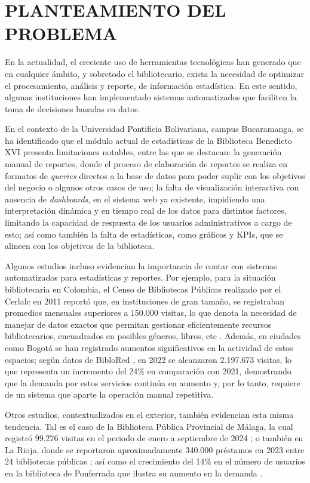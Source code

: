 \documentclass[spanish]{ieee_upb}
\begin{document}
\newpage
\section{PLANTEAMIENTO DEL PROBLEMA}

En la actualidad, el creciente uso de herramientas tecnológicas han generado que en cualquier ámbito, y sobretodo el bibliotecario, exista la necesidad de optimizar el procesamiento, análisis y reporte, de información estadística. En este sentido, algunas instituciones han implementado sistemas automatizados que faciliten la toma de decisiones basadas en datos. 


En el contexto de la Universidad Pontificia Bolivariana, campus Bucaramanga, se ha identificado que el módulo actual de estadísticas de la Biblioteca Benedicto XVI presenta limitaciones notables, entre las que se destacan: la generación manual de reportes, donde el proceso de elaboración de reportes se realiza en formatos de \textit{queries} directos a la base de datos para poder suplir con los objetivos del negocio o algunos otros casos de uso; la falta de visualización interactiva con ausencia de \textit{dashboards}, en el sistema web ya existente, impidiendo una interpretación dinámica y en tiempo real de los datos para distintos factores, limitando la capacidad de respuesta de los usuarios administrativos a cargo de esto; así como también la falta de estadísticas, como gráficos y KPIs, que se alineen con los objetivos de la biblioteca.


Algunos estudios incluso evidencian la importancia de contar con sistemas automatizados para estadísticas y reportes. Por ejemplo, para la situación bibliotecaria en Colombia, el Censo de Bibliotecas Públicas realizado por el Cerlalc en 2011 reportó que, en instituciones de gran tamaño, se registraban promedios mensuales superiores a 150.000 visitas, lo que denota la necesidad de manejar de datos exactos que permitan gestionar eficientemente recursos bibliotecarios, encuadrados en posibles géneros, libros, etc \cite{CERLALC2011}. Además, en ciudades como Bogotá se han registrado aumentos significativos en la actividad de estos espacios; según datos de BibloRed \cite{BIBLORED2022}, en 2022 se alcanzaron 2.197.673 visitas, lo que representa un incremento del 24\% en comparación con 2021, demostrando que la demanda por estos servicios continúa en aumento y, por lo tanto, requiere de un sistema que aparte la operación manual repetitiva.


Otros estudios, contextualizados en el exterior, también evidencian esta misma tendencia. Tal es el caso de la Biblioteca Pública Provincial de Málaga, la cual registró 99.276 visitas en el periodo de enero a septiembre de 2024 \cite{SER_malaga2024}; o también en La Rioja, donde se reportaron aproximadamente 340.000 préstamos en 2023 entre 24 bibliotecas públicas \cite{SER_rioja2024}; así como el crecimiento del 14\% en el número de usuarios en la biblioteca de Ponferrada que ilustra su aumento en la demanda \cite{SER_ponferrada2025}.
\end{document}
